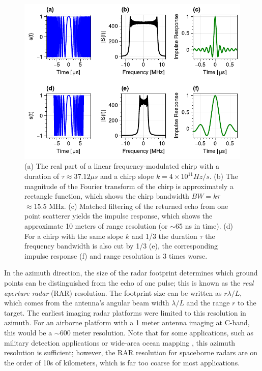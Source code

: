 \begin{figure}
	\centering
	\includegraphics[width=0.99\linewidth]{figures/chapter3-sar/radar-chirp-bandwidth-ers.pdf}
	\caption[Range resolution from chirp compression]{
		(a) The real part of a linear frequency-modulated chirp with a duration of $\tau \approx 37.12 \mu s$ and a chirp slope $k = 4 \times 10^{11} Hz / s$.
		(b) The magnitude of the Fourier transform of the chirp is approximately a rectangle function, which shows the chirp bandwidth $BW = k \tau$ $\approx 15.5$ MHz.
		(c) Matched filtering of the returned echo from one point scatterer yields the impulse response, which shows the approximate 10 meters of range resolution (or $\sim$65 ns in time).
		(d) For a chirp with the same slope $k$ and 1/3 the duration $\tau$ the frequency bandwidth is also cut by 1/3 (e), the corresponding impulse response (f) and range resolution is 3 times worse.
	}
	\label{fig:ch3-range-compress}
\end{figure}


In the azimuth direction, the size of the radar footprint determines which ground points can be distinguished from the echo of one pulse;  this is known as the \emph{real aperture radar} (RAR) resolution. The footprint size can be written as $r \lambda / L$, which comes from the antenna's angular beam width $\lambda / L$ and the range $r$ to the target. The earliest imaging radar platforms were limited to this resolution in azimuth. For an airborne platform with a 1 meter antenna imaging at C-band, this would be a $\sim$600 meter resolution. Note that for some applications, such as military detection applications or wide-area ocean mapping \cite{Simons2007InterferometricSyntheticAperture}, this azimuth resolution is sufficient; however, the RAR resolution for spaceborne radars are on the order of 10s of kilometers, which is far too coarse for most applications.



